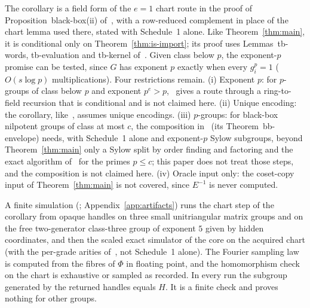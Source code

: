 \begin{remark}
\label{rem:black-box-scope}
The corollary is a field form of the $e = 1$ chart route in the proof of Proposition~black-box(ii) of~\fullv, with a row-reduced complement in place of the chart lemma used there, stated with Schedule~1 alone. Like Theorem~\ref{thm:main}, it is conditional only on Theorem~\ref{thm:is-import}; its proof uses Lemmas~tb-words, tb-evaluation and tb-kernel of~\fullv. Given class below $p$, the exponent-$p$ promise can be tested, since $G$ has exponent $p$ exactly when every $g_i^p = 1$ ($O(s\log p)$ multiplications). Four restrictions remain. (i) Exponent $p$: for $p$-groups of class below $p$ and exponent $p^e > p$,~\fullv{} gives a route through a ring-to-field recursion that is conditional and is not claimed here. (ii) Unique encoding: the corollary, like~\cite{ImranIvanyos2023}, assumes unique encodings. (iii) $p$-groups: for black-box nilpotent groups of class at most $c$, the composition in~\fullv{} (its Theorem~bb-envelope) needs, with Schedule~1 alone and exponent-$p$ Sylow subgroups, beyond Theorem~\ref{thm:main} only a Sylow split by order finding and factoring and the exact algorithm of~\cite[Theorem~1]{ImranIvanyos2023} for the primes $p \le c$; this paper does not treat those steps, and the composition is not claimed here. (iv) Oracle input only: the coset-copy input of Theorem~\ref{thm:main} is not covered, since $E^{-1}$ is never computed.

A finite simulation (; Appendix~\ref{app:artifacts}) runs the chart step of the corollary from opaque handles on three small unitriangular matrix groups and on the free two-generator class-three group of exponent $5$ given by hidden coordinates, and then the scaled exact simulator of the core on the acquired chart (with the per-grade arities of~\fullv, not Schedule~1 alone). The Fourier sampling law is computed from the fibres of $\Phi$ in floating point, and the homomorphism check on the chart is exhaustive or sampled as recorded. In every run the subgroup generated by the returned handles equals $H$. It is a finite check and proves nothing for other groups.
\end{remark}

